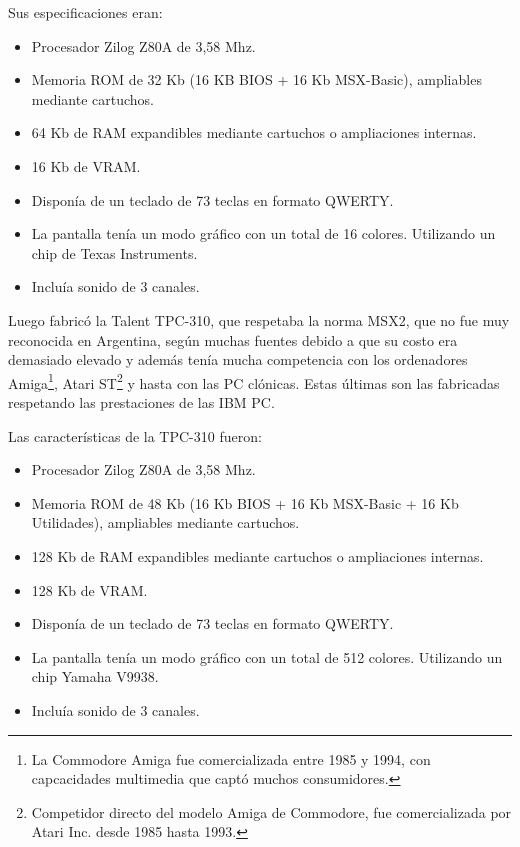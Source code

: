 \documentclass[%
  	final,
%
	notitlepage,
	narroweqnarray,
	inline,
 	twoside,
	]{ieee}
\begin{document}
Sus especificaciones eran:\\

\begin{itemize}
\item Procesador Zilog Z80A de 3,58 Mhz.
\item Memoria ROM de 32 Kb (16 KB BIOS + 16 Kb MSX-Basic), ampliables mediante cartuchos.
\item 64 Kb de RAM expandibles mediante cartuchos o ampliaciones internas.
\item 16 Kb de VRAM.
\item Dispon\'ia de un teclado de 73 teclas en formato QWERTY.
\item La pantalla ten\'ia un modo gr\'afico con un total de 16 colores. Utilizando un chip de Texas Instruments.
\item Inclu\'ia sonido de 3 canales.\\
\end{itemize}

Luego fabric\'o la Talent TPC-310\cite{talent310}, que respetaba la norma MSX2, que no fue muy reconocida en Argentina, seg\'un muchas fuentes debido a que su costo era demasiado elevado y adem\'as ten\'ia mucha competencia con los ordenadores Amiga\footnote{La Commodore Amiga fue comercializada entre 1985 y 1994, con capcacidades multimedia que capt\'o muchos consumidores\cite{amiga}.}, Atari ST\footnote{Competidor directo del modelo Amiga de Commodore, fue comercializada por Atari Inc. desde 1985 hasta 1993\cite{atari}.} y hasta con las PC cl\'onicas. Estas \'ultimas son las fabricadas respetando las prestaciones de las IBM PC.

Las caracter\'isticas de la TPC-310 fueron:\\

\begin{itemize}
\item Procesador Zilog Z80A de 3,58 Mhz.
\item Memoria ROM de 48 Kb (16 Kb BIOS + 16 Kb MSX-Basic + 16 Kb Utilidades), ampliables mediante cartuchos.
\item 128 Kb de RAM expandibles mediante cartuchos o ampliaciones internas.
\item 128 Kb de VRAM.
\item Dispon\'ia de un teclado de 73 teclas en formato QWERTY.
\item La pantalla ten\'ia un modo gr\'afico con un total de 512 colores. Utilizando un chip Yamaha V9938.
\item Inclu\'ia sonido de 3 canales.
\end{itemize}
\end{document}
